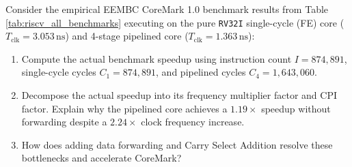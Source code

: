 \begin{problem}
Consider the empirical EEMBC CoreMark 1.0 benchmark results from Table \ref{tab:riscv_all_benchmarks} executing on the pure \texttt{RV32I} single-cycle (FE) core ($T_{\text{clk}} = 3.053\,\text{ns}$) and 4-stage pipelined core ($T_{\text{clk}} = 1.363\,\text{ns}$):
\begin{enumerate}
    \item Compute the actual benchmark speedup using instruction count $I = 874,891$, single-cycle cycles $C_1 = 874,891$, and pipelined cycles $C_4 = 1,643,060$.
    \item Decompose the actual speedup into its frequency multiplier factor and CPI factor. Explain why the pipelined core achieves a $1.19\times$ speedup without forwarding despite a $2.24\times$ clock frequency increase.
    \item How does adding data forwarding and Carry Select Addition resolve these bottlenecks and accelerate CoreMark?
\end{enumerate}


\end{problem}
